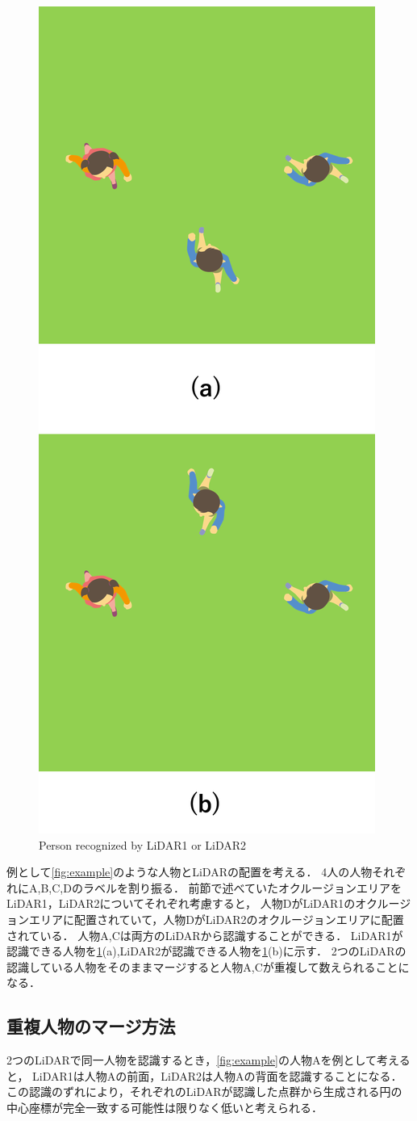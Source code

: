 \documentclass[autodetect-engine,dvipdfmx-if-dvi,ja=standard,a4j,jbase=11pt,magstyle=nomag*]{bxjsreport}
\begin{document}
\begin{figure}[p]
    \centering
    \includegraphics[width=0.5\linewidth, clip]{./figure/chapter3/recognized_person.png}
    \caption{Person recognized by LiDAR1 or LiDAR2}
    \label{fig:person_recognized}
\end{figure}

\newpage
例として\cref{fig:example}のような人物とLiDARの配置を考える．
4人の人物それぞれにA,B,C,Dのラベルを割り振る．
前節で述べていたオクルージョンエリアをLiDAR1，LiDAR2についてそれぞれ考慮すると，
人物DがLiDAR1のオクルージョンエリアに配置されていて，人物DがLiDAR2のオクルージョンエリアに配置されている．
人物A,Cは両方のLiDARから認識することができる．
LiDAR1が認識できる人物を\cref{fig:person_recognized}(a),LiDAR2が認識できる人物を\cref{fig:person_recognized}(b)に示す．
2つのLiDARの認識している人物をそのままマージすると人物A,Cが重複して数えられることになる．

\subsection{重複人物のマージ方法}
2つのLiDARで同一人物を認識するとき，\cref{fig:example}の人物Aを例として考えると，
LiDAR1は人物Aの前面，LiDAR2は人物Aの背面を認識することになる．
この認識のずれにより，それぞれのLiDARが認識した点群から生成される円の中心座標が完全一致する可能性は限りなく低いと考えられる．
\end{document}
